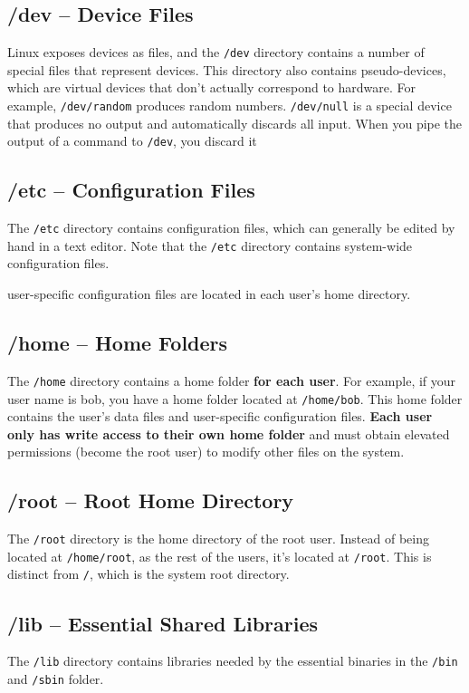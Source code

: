 \documentclass{article}
\newenvironment{blocktemplate}[1]{%
    \tcolorbox[beamer,%
    noparskip,breakable,
    colframe=Blue,%
    colbacklower=LimeGreen!75!LightGreen,%
    title=#1]}%
    {\endtcolorbox}
\begin{document}
\subsection{/dev -- Device Files}
Linux exposes devices as files, and the \verb|/dev| directory contains a number of special files that represent devices. This directory also contains pseudo-devices, which are virtual devices that don't actually correspond to hardware. For example, \verb|/dev/random| produces random numbers. \verb|/dev/null| is a special device that produces no output and automatically discards all input. When you pipe the output of a command to \verb|/dev|, you discard it

\subsection{/etc -- Configuration Files}
The \verb|/etc| directory contains configuration files, which can generally be edited by hand in a text editor. Note that the \verb|/etc| directory contains system-wide configuration files.

\begin{blocktemplate}{NOTE}
user-specific configuration files are located in each user's home directory.
\end{blocktemplate}

\subsection{/home -- Home Folders}
The \verb|/home| directory contains a home folder \textbf{for each user}. For example, if your user name is bob, you have a home folder located at \verb|/home/bob|. This home folder contains the user's data files and user-specific configuration files. \textbf{Each user only has write access to their own home folder} and must obtain elevated permissions (become the root user) to modify other files on the system.

\subsection{/root -- Root Home Directory}
The \verb|/root| directory is the home directory of the root user. Instead of being located at \verb|/home/root|, as the rest of the users, it's located at \verb|/root|. This is distinct from \verb|/|, which is the system root directory.

\subsection{/lib -- Essential Shared Libraries}
The \verb|/lib| directory contains libraries needed by the essential binaries in the \verb|/bin| and \verb|/sbin| folder.
\end{document}
